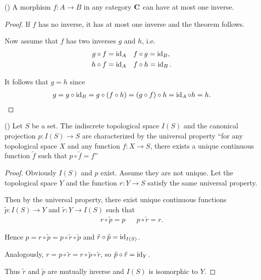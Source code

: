 \begin{proposition}\label{ex:at_most_one_isomorphism}(\cite[exercise 1.1.13]{Leinster2014})
  A morphism $f: A \to B$ in any category $\operatorname{\mathbf{C}}$ can have at most one inverse.
\end{proposition}
\begin{proof}
  If $f$ has no inverse, it has at most one inverse and the theorem follows.

  Now assume that $f$ has two inverses $g$ and $h$, i.e.
  \begin{align*}
    g \circ f = \operatorname{id}_A && &f \circ g = \operatorname{id}_B,
    \\
    h \circ f = \operatorname{id}_A && &f \circ h = \operatorname{id}_B.
  \end{align*}

  It follows that $g = h$ since
  \begin{align*}
    g
    =
    g \circ \operatorname{id}_B
    =
    g \circ (f \circ h)
    =
    (g \circ f) \circ h
    =
    \operatorname{id}_A \circ h
    =
    h.
  \end{align*}
\end{proof}

\begin{example}\label{ex:indiscrete_topology_universal_property}(\cite[exercise 0.10]{Leinster2014})
  Let $S$ be a set. The indiscrete topological space $I(S)$ and the canonical projection $p: I(S) \to S$ are characterized by the universal property \enquote{for any topological space $X$ and any function $f: X \to S$, there exists a unique continuous function $\tilde f$ such that $p \circ \tilde f = f$}

  \begin{figure}[ht]
    \center
  \end{figure}
\end{example}
\begin{proof}
  Obviously $I(S)$ and $p$ exist. Assume they are not unique. Let the topological space $Y$ and the function $r: Y \to S$ satisfy the same universal property.

  Then by the universal property, there exist unique continuous functions $\tilde p: I(S) \to Y$ and $\tilde r: Y \to I(S)$ such that
  \begin{align*}
    r \circ \tilde p = p
    &&
    p \circ \tilde r = r.
  \end{align*}

  Hence $p = r \circ \tilde p = p \circ \tilde r \circ \tilde p$ and $\tilde r \circ \tilde p = \operatorname{id}_{I(S)}$.

  Analogously, $r = p \circ \tilde r = r \circ \tilde p \circ \tilde r$, so $\tilde p \circ \tilde r = \operatorname{id}_Y$.

  Thus $\tilde r$ and $\tilde p$ are mutually inverse and $I(S)$ is isomorphic to $Y$.
\end{proof}

